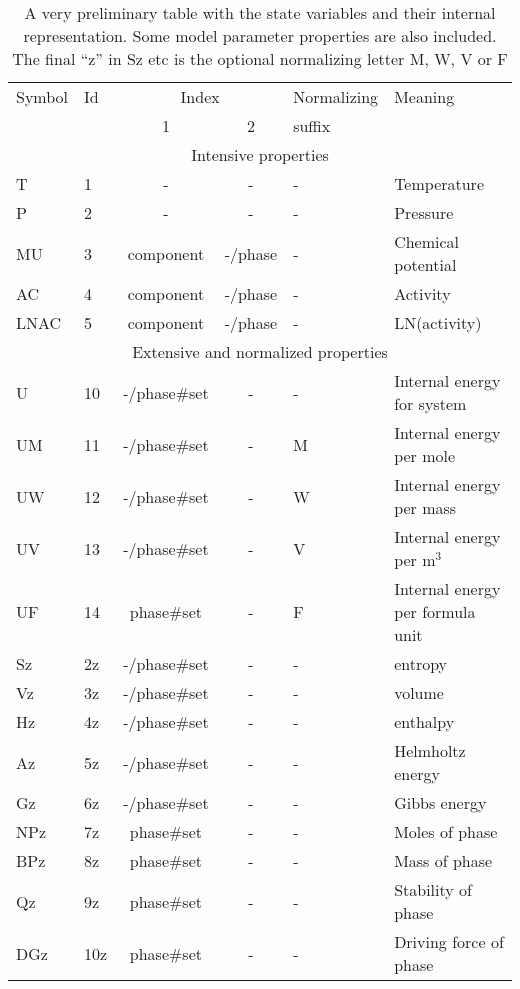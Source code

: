 \documentclass[12pt]{article}
\begin{document}
\begin{table}[!h]
\caption{A very preliminary table with the state variables and their
  internal representation.  Some model parameter properties are also
  included.  The final ``z'' in Sz etc is the optional normalizing
  letter M, W, V or F}\label{tab:statevar}
\begin{tabular}{|llccll|}\hline
Symbol & Id & \multicolumn{2}{c}{Index} & Normalizing & Meaning\\
       &    & 1 & 2                     &  suffix     & \\\hline
\multicolumn{6}{|c|}{Intensive properties}\\\hline
T      & 1  & -         & -    & - & Temperature\\
P      & 2  & -         & -    & - & Pressure\\
MU     & 3  & component & -/phase  & - & Chemical potential\\
AC     & 4  & component & -/phase  & - & Activity\\
LNAC   & 5  & component & -/phase  & - & LN(activity)\\\hline
\multicolumn{6}{|c|}{Extensive and normalized properties}\\\hline
U      & 10 & -/phase\#set & - & - & Internal energy for system\\
UM     & 11 & -/phase\#set & - & M & Internal energy per mole\\
UW     & 12 & -/phase\#set & - & W & Internal energy per mass\\
UV     & 13 & -/phase\#set & - & V & Internal energy per m$^3$\\
UF     & 14 & phase\#set   & - & F & Internal energy per formula unit\\
Sz     & 2z & -/phase\#set & - & - & entropy\\
Vz     & 3z & -/phase\#set & - & - & volume\\
Hz     & 4z & -/phase\#set & - & - & enthalpy\\
Az     & 5z & -/phase\#set & - & - & Helmholtz energy\\
Gz     & 6z & -/phase\#set & - & - & Gibbs energy\\
NPz    & 7z &  phase\#set & - & - & Moles of phase\\
BPz    & 8z & phase\#set & - & - & Mass of phase\\
Qz     & 9z & phase\#set & - & -  & Stability of phase\\
DGz    & 10z & phase\#set & - & -  & Driving force of phase\\

\end{tabular}
\end{table}
\end{document}
